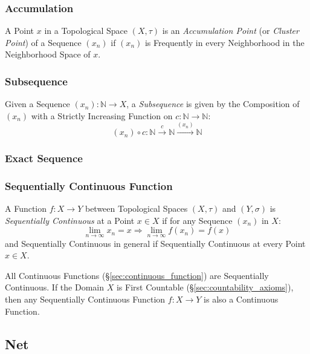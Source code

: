 \subsubsection{Accumulation}\label{sec:accumulation}

A Point $x$ in a Topological Space $(X, \tau)$ is an
\emph{Accumulation Point} (or \emph{Cluster Point}) of a Sequence
$(x_n)$ if $(x_n)$ is Frequently in every Neighborhood in the
Neighborhood Space of $x$.



\subsubsection{Subsequence}\label{sec:subsequence_topology}

Given a Sequence $(x_n) : \mathbb{N} \rightarrow X$, a
\emph{Subsequence} is given by the Composition of $(x_n)$ with a
Strictly Increasing Function on $c : \mathbb{N} \rightarrow
\mathbb{N}$:
\[
  (x_n) \circ c :
  \mathbb{N} \xrightarrow{c} \mathbb{N} \xrightarrow{(x_n)} \mathbb{N}
\]



\subsubsection{Exact Sequence}\label{sec:exact_sequence}

\subsubsection{Sequentially Continuous Function}
\label{sec:sequentially_continuous}

A Function $f : X \rightarrow Y$ between Topological Spaces $(X,
\tau)$ and $(Y, \sigma)$ is \emph{Sequentially Continuous} at a Point
$x \in X$ if for any Sequence $(x_n)$ in $X$:
\[
  \lim_{n \rightarrow \infty} x_n = x
  \Rightarrow \lim_{n \rightarrow \infty} f(x_n) = f(x)
\]
and Sequentially Continuous in general if Sequentially Continuous at
every Point $x \in X$.

All Continuous Functions (\S\ref{sec:continuous_function}) are
Sequentially Continuous. If the Domain $X$ is First Countable
(\S\ref{sec:countability_axioms}), then any Sequentially Continuous
Function $f : X \rightarrow Y$ is also a Continuous Function.



\subsection{Net}\label{sec:net}

